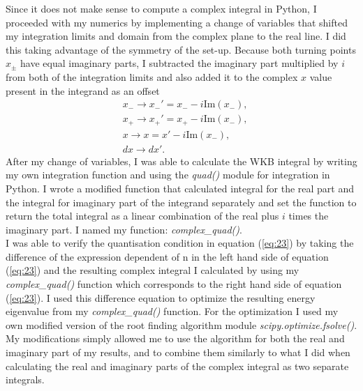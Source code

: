 \documentclass[10pt, a4paper, singlespacing, headsepline]{report}
\begin{document}
Since it does not make sense to compute a complex integral in Python, I proceeded with my numerics by implementing a change of variables that shifted my integration limits and domain from the complex plane to the real line. I did this taking advantage of the symmetry of the set-up. Because both turning points $x_{\pm}$ have equal imaginary parts, I subtracted the imaginary part multiplied by $i$ from both of the integration limits and also added it to the complex $x$ value present in the integrand as an offset
\begin{equation} \label{eq:24}
\begin{split}
&x_{-}\rightarrow x_{-}' = x_{-} - i \mathrm{Im}(x_{-}),\\
&x_{+}\rightarrow x_{+}' = x_{+} - i \mathrm{Im}(x_{-}),\\
&x\rightarrow x = x' - i \mathrm{Im}(x_{-}),\\
&dx\rightarrow dx'.
\end{split}
\end{equation}
After my change of variables, I was able to calculate the WKB integral by writing my own integration function and using the \emph{quad()} module for integration in Python. I wrote a modified function that calculated integral for the real part and the integral for imaginary part of the integrand separately and set the function to return the total integral as a linear combination of the real plus $i$ times the imaginary part. I named my function: \emph{complex\_quad()}.\\
I was able to verify the quantisation condition in equation (\ref{eq:23}) by taking the difference of the expression dependent of n in the left hand side of equation (\ref{eq:23}) and the resulting complex integral I calculated by using my \emph{complex\_quad()} function which corresponds to the right hand side of equation (\ref{eq:23}). I used this difference equation to optimize the resulting energy eigenvalue from my \emph{complex\_quad()} function. For the optimization I used my own modified version of the root finding algorithm module \emph{scipy.optimize.fsolve()}. My modifications simply allowed me to use the algorithm for both the real and imaginary part of my results, and to combine them similarly to what I did when calculating the real and imaginary parts of the complex integral as two separate integrals.
\end{document}
